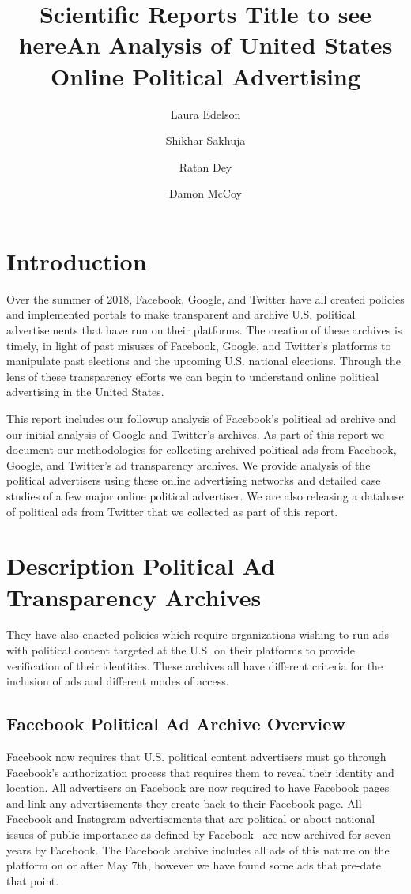 \documentclass[fleqn,10pt]{wlscirep}
\title{Scientific Reports Title to see here}
\title{An Analysis of United States Online Political Advertising}
\author[1]{Laura Edelson}
\author[1]{Shikhar Sakhuja}
\author[1]{Ratan Dey}
\author[1]{Damon McCoy}
\affil[1]{New York University}
\begin{document}


\flushbottom
\maketitle

\thispagestyle{empty}


\section*{Introduction}
Over the summer of 2018, Facebook, Google, and Twitter have all created policies and implemented portals to make transparent and archive U.S. political advertisements that have run on their platforms. The creation of these archives is timely, in light of past misuses of Facebook, Google, and Twitter's  platforms to manipulate past elections and the upcoming U.S. national elections. Through the lens of these transparency efforts we can begin to understand online political advertising in the United States.

This report includes our followup analysis of Facebook's political ad archive and our initial analysis of Google and Twitter's archives. As part of this report we document our methodologies for collecting archived political ads from Facebook, Google, and Twitter's ad transparency archives. We provide analysis of the political advertisers using these online advertising networks and detailed case studies of a few major online political advertiser. We are also releasing a database of political ads from Twitter that we collected as part of this report. 


\section*{Description Political Ad Transparency Archives}

They have also enacted policies which require organizations wishing to run ads with political content targeted at the U.S. on their platforms to provide verification of their identities. These archives all have different criteria for the inclusion of ads and different modes of access. 


\subsection*{Facebook Political Ad Archive Overview}

Facebook now requires that U.S. political content advertisers must go through Facebook's authorization process that requires them to reveal their identity and location. All advertisers on Facebook are now required to have Facebook pages and link any advertisements they create back to their Facebook page. All Facebook and Instagram advertisements that are political or about national issues of public importance as defined by Facebook~\cite{FB_National} are now archived for seven years by Facebook. The Facebook archive includes all ads of this nature on the platform on or after May 7th, however we have found some ads that pre-date that point.
\end{document}
